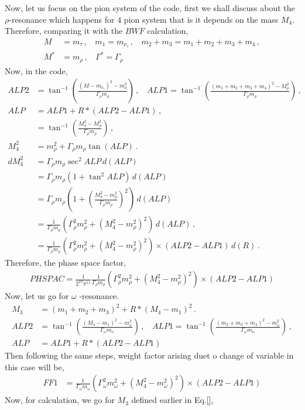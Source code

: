 \documentclass[12pt]{article}
\begin{document}
{{ Now, let us focus on the pion system of the code, first we shall discuss about the $\rho$-resonance which happens for 4 pion system that is it depends on the mass $M_4$.
 Therefore, comparing it with the $BWF$ calculation,
 \begin{align}
     M &= m_\tau \,, ~~~~ m_1 = m_{\nu_\tau}\,, ~~~~ m_2 + m_3 = m_1+m_2+m_3+m_4 \,,\\
     M^* &= m_{\rho} \,, ~~~~ \Gamma^* = \Gamma_{\rho}
 \end{align}
 Now, in the code,
 \begin{align}
     ALP2 &= \tan^{-1}\left(\frac{(M-m_{\nu_\tau})^2 - m_\rho^2}{\Gamma_\rho m_\rho}\right) \,, ~~~~ ALP1 = \tan^{-1}\left( \frac{(m_1 + m_2 + m_3 +m_4)^2 - M^2_\rho}{\Gamma_\rho m_\rho} \right) \,,\\
     ALP &= ALP1 + R* (ALP2 - ALP1) \,,\\
     &= \tan^{-1}\left(\frac{M_4^2 - M_\rho^2}{\Gamma_\rho m_\rho}\right) \,,\\
     M_4^2 &= m_\rho^2 + \Gamma_\rho m_\rho \tan{(ALP)} \,. \\
     dM_4^2 &= \Gamma_\rho m_\rho \sec^2{ALP} \, d(ALP) \nonumber \\
     &=  \Gamma_\rho m_\rho (1+ \tan^2{ALP}) \, d(ALP) \nonumber \\
     &=  \Gamma_\rho m_\rho \left(1+ \left(\frac{M_4^2 -m_\rho^2}{\Gamma_\rho m_\rho} \right)^2 \right) \, d(ALP) \nonumber\\
     &= \frac{1}{\Gamma_\rho m_\rho} \left( \Gamma_\rho^2 m_\rho^2 + (M_4^2 - m_\rho^2)^2\right)\,  d(ALP) \,,\\
     &= \frac{1}{\Gamma_\rho m_\rho} \left( \Gamma_\rho^2 m_\rho^2 + (M_4^2 - m_\rho^2)^2\right) \times (ALP2 -ALP1) \, d(R) \,.
 \end{align}
Therefore, the phase space factor,
\begin{align}
    PHSPAC = \frac{1}{2^{23} \pi^{11}} \frac{1}{\Gamma_\rho m_\rho} \left( \Gamma_\rho^2 m_\rho^2 + (M_4^2 - m_\rho^2)^2\right) \times (ALP2 -ALP1)
\end{align}
Now, let us go for $\omega$ -resonance.
\begin{align}
    M_3 &= (m_1+m_2+m_3)^2 + R*(M_4 - m_1)^2 \,. \\
    ALP2 &= \tan^{-1}\left(\frac{(M_4-m_{1})^2 - m_\omega^2}{\Gamma_\omega m_\omega}\right) \,, ~~~~ ALP1 = \tan^{-1}\left( \frac{( m_2 + m_3 +m_4)^2 - m^2_\omega}{\Gamma_\omega m_\omega} \right) \,,\\
     ALP &= ALP1 + R* (ALP2 - ALP1)
\end{align}
  Then following the same steps, weight factor arising duet o change of variable in this case will be,
  \begin{align}
    FF1 &=   \frac{1}{\Gamma_\omega m_\omega} \left( \Gamma_\omega^2 m_\omega^2 + (M_4^2 - m_\omega^2)^2\right) \times (ALP2 -ALP1)
  \end{align}
  Now, for calculation, we go for $M_3$ defined earlier in Eq.\ref{},







}}
\end{document}
